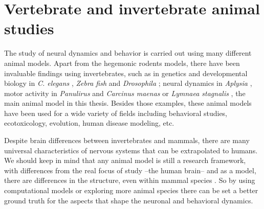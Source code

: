 \section{Vertebrate and invertebrate animal studies}
\label{c-intro-invertebrates}
The study of neural dynamics and behavior is carried out using many different animal models. Apart from the hegemonic rodents models, there have been invaluable findings using invertebrates, such as in genetics and developmental biology in \textit{C. elegans} \parencite{brenner_genetics_1974}, \textit{Zebra fish} \parencite{streisinger_production_1981} and \textit{Drosophila} \parencite{nusslein-volhard_mutations_1980}; neural dynamics in \textit{Aplysia} \parencite{wachtel_direct_1967}, motor activity in \textit{Panulirus} \parencite{SELVERSTON1976} and \textit{Carcinus maenas} \parencite{eisen_mechanisms_1982} or \textit{Lymnaea stagnalis} \parencite{Benjamin1979b}, the main animal model in this thesis. Besides those examples, these animal models have been used for a wide variety of fields including behavioral studies, ecotoxicology, evolution, human disease modeling, etc. \parencite{romanova_animal_2018} 

Despite brain differences between invertebrates and mammals, there are many universal characteristics of nervous systems that can be extrapolated to humans. We should keep in mind that any animal model is still a research framework, with differences from the real focus of study --the human brain-- and as a model, there are differences in the structure, even within mammal species \parencite{preuss_taking_2000}. So by using computational models or exploring more animal species there can be set a better ground truth for the aspects that shape the neuronal and behavioral dynamics. 


